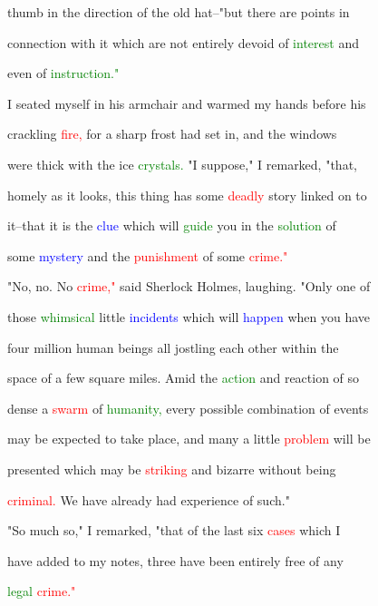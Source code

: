  thumb in the direction of the old hat--"but there are points in

 connection with it which are not entirely devoid of \textcolor{green}{interest} and

 even of \textcolor{green}{instruction."}



 I seated myself in his armchair and warmed my hands before his

 crackling \textcolor{red}{fire,} for a sharp frost had set in, and the windows

 were thick with the ice \textcolor{green}{crystals.} "I suppose," I remarked, "that,

 homely as it looks, this thing has some \textcolor{red}{deadly} story linked on to

 it--that it is the \textcolor{blue}{clue} which will \textcolor{green}{guide} you in the \textcolor{green}{solution} of

 some \textcolor{blue}{mystery} and the \textcolor{red}{punishment} of some \textcolor{red}{crime."}



 "No, no. No \textcolor{red}{crime,"} said Sherlock Holmes, \textcolor{BurntOrange}{laughing.} "Only one of

 those \textcolor{green}{whimsical} little \textcolor{blue}{incidents} which will \textcolor{blue}{happen} when you have

 four million human beings all jostling each other within the

 space of a few square miles. Amid the \textcolor{green}{action} and reaction of so

 dense a \textcolor{red}{swarm} of \textcolor{green}{humanity,} every possible combination of events

 may be \textcolor{BurntOrange}{expected} to take place, and many a little \textcolor{red}{problem} will be

 \textcolor{BurntOrange}{presented} which may be \textcolor{red}{striking} and \textcolor{BurntOrange}{bizarre} without being

 \textcolor{red}{criminal.} We have already had experience of such."



 "So much so," I remarked, "that of the last six \textcolor{red}{cases} which I

 have added to my notes, three have been entirely free of any

 \textcolor{green}{legal} \textcolor{red}{crime."}



